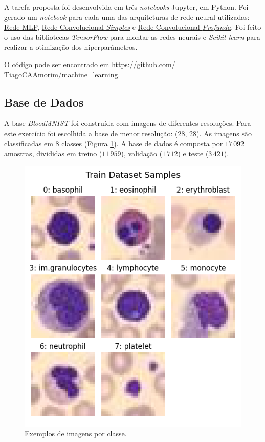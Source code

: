 \documentclass[final,5p]{elsarticle}
\numberwithin{equation}{section}
\begin{document}
    A tarefa proposta foi desenvolvida em três \emph{notebooks} Jupyter, em Python. Foi gerado um \emph{notebook} para cada uma das arquiteturas de rede neural utilizadas: \href{https://github.com/TiagoCAAmorim/machine_learning/blob/main/Lista03/Lista03_MLP.ipynb}{Rede MLP}, \href{https://github.com/TiagoCAAmorim/machine_learning/blob/main/Lista03/Lista03_SimpleCNN.ipynb}{Rede Convolucional \emph{Simples}} e \href{https://github.com/TiagoCAAmorim/machine_learning/blob/main/Lista03/Lista03_ResNet.ipynb}{Rede Convolucional \emph{Profunda}}. Foi feito o uso das bibliotecas \emph{TensorFlow} \cite{tensorflow2015-whitepaper} para montar as redes neurais e \emph{Scikit-learn} \cite{scikit-learn} para realizar a otimização dos hiperparâmetros.

    O código pode ser encontrado em \href{https://github.com/TiagoCAAmorim/machine_learning/blob/main/Lista03}{https://github.com/ TiagoCAAmorim/machine\_learning}.

    \subsection{Base de Dados}

    A base \emph{BloodMNIST} foi construída com imagens de diferentes resoluções. Para este exercício foi escolhida a base de menor resolução: (28, 28). As imagens são classificadas em 8 classes (Figura \ref{fig:AmostrasPainel}). A base de dados é composta por $17\,092$ amostras, divididas em treino ($11\,959$), validação ($1\,712$) e teste ($3\,421$).

    \begin{figure}[hbt!]
        \includegraphics[width=0.95\columnwidth]{Samples_panel.png}
        \caption{Exemplos de imagens por classe.}\label{fig:AmostrasPainel}
    \end{figure}
\end{document}
